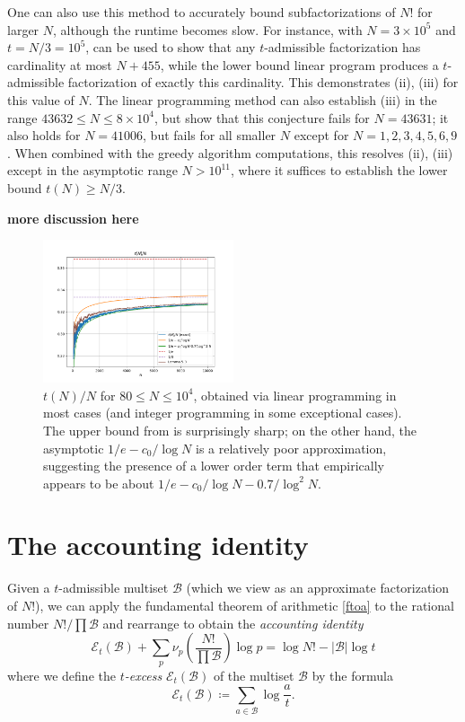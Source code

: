 \documentclass[12pt,a4paper,reqno]{amsart}
\numberwithin{equation}{section}
\theoremstyle{plain}
\theoremstyle{definition}
\newcommand\tuple{{\mathcal B}}
\newcommand\excess{{\mathcal{E}}}
\begin{document}
One can also use this method to accurately bound subfactorizations of $N!$ for larger $N$, although the runtime becomes slow.  For instance, with $N = 3 \times 10^5$ and $t = N/3 = 10^5$,  can be used to show that any $t$-admissible factorization has cardinality at most $N+455$, while the lower bound linear program produces a $t$-admissible factorization of exactly this cardinality.  This demonstrates (ii), (iii) for this value of $N$.  The linear programming method can also establish (iii) in the range $43632 \leq N \leq 8 \times 10^4$, but show that this conjecture fails for $N = 43631$; it also holds for $N=41006$, but fails for all smaller $N$ except for $N=1,2,3,4,5,6,9$.  When combined with the greedy algorithm computations, this resolves (ii), (iii) except in the asymptotic range $N > 10^{11}$, where it suffices to establish the lower bound $t(N) \geq N/3$.

{\bf more discussion here}


\begin{figure}
  \centering
  \includegraphics[width=0.5\textwidth]{longplot.png}
  \caption{$t(N)/N$ for $80 \leq N \leq 10^4$, obtained via linear programming in most cases (and integer programming in some exceptional cases).  The upper bound from  is surprisingly sharp; on the other hand, the asymptotic $1/e - c_0/\log N$ is a relatively poor approximation, suggesting the presence of a lower order term that empirically appears to be about $1/e - c_0/\log N - 0.7/\log^2 N$.}
  \label{fig-long}
  \end{figure}

\section{The accounting identity}\label{accounting-sec}

Given a $t$-admissible multiset $\tuple$ (which we view as an approximate factorization of $N!$), we can apply the fundamental theorem of arithmetic \eqref{ftoa} to the rational number  $N!/\prod \tuple$ and rearrange to obtain the \emph{accounting identity}
\begin{equation}\label{accounting} 
  \excess_t(\tuple) + \sum_p \nu_p\left( \frac{N!}{\prod \tuple} \right) \log p = \log N! - |\tuple| \log t
\end{equation}
where we define the \emph{$t$-excess} $\excess_t(\tuple)$ of the multiset $\tuple$ by the formula
\begin{equation}\label{excess-def}
  \excess_t(\tuple) \coloneqq \sum_{a \in \tuple} \log \frac{a}{t}.
\end{equation}
\end{document}
